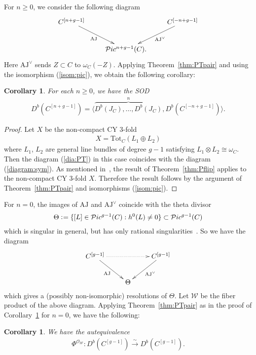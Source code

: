 \documentclass[11pt]{amsart}
\theoremstyle{plain}
\newtheorem{cor}[thm]{Corollary}
\newcommand{\oO}{\mathcal{O}}
\newcommand{\pP}{\mathcal{P}}
\newcommand{\wW}{\mathcal{W}}
\begin{document}
For $n\ge 0$, we consider the following 
diagram
\begin{align}\label{diagram:sym}
\xymatrix{
C^{[n+g-1]} \ar[rd]_-{\mathrm{AJ}} &  & 
C^{[-n+g-1]} \ar[ld]^-{\mathrm{AJ}^{\vee}} \\
&  \pP ic^{n+g-1}(C). &
}
\end{align}
Here $\mathrm{AJ}^{\vee}$ 
sends $Z \subset C$ to $\omega_C(-Z)$. 
Applying Theorem~\ref{thm:PTpair}
and using the isomorphism (\ref{isom:pic}), 
we obtain the following corollary:

\begin{cor}\label{thm:sod:sym}
For each $n\ge 0$, we have the SOD
\begin{align*}
D^b(C^{[n+g-1]})=
\langle \overbrace{D^b(J_C), \ldots, 
D^b(J_C)}^{n}, D^b(C^{[-n+g-1]}) \rangle. 
\end{align*}
\end{cor} 
\begin{proof}
Let 
$X$ be the non-compact CY 3-fold
\begin{align*}
X=\mathrm{Tot}_C(L_1 \oplus L_2)
\end{align*}
where $L_1$, $L_2$ are general line bundles 
of degree $g-1$ satisfying $L_1 \otimes L_2 \cong \omega_C$.
Then the diagram (\ref{dia:PT}) in this 
case coincides with the diagram (\ref{diagram:sym}).
As mentioned in~\cite[Example~9.22, Remark~9.23]{Toddbir}, 
the result of Theorem~\ref{thm:Pflip} applies 
to the non-compact CY 3-fold $X$. 
Therefore the result 
follows by the argument of Theorem~\ref{thm:PTpair}
and isomorphisms (\ref{isom:pic}). 
\end{proof}

For $n=0$, the images of
$\mathrm{AJ}$ and $\mathrm{AJ}^{\vee}$ coincide with
the theta divisor
\begin{align*}
\Theta \cneq \{ [L] \in \pP ic^{g-1}(C) : 
h^0(L) \neq 0\} \subset \pP ic^{g-1}(C)
\end{align*}
which is singular in general, but 
has only rational singularities~\cite{MR0349687}. 
So we have the diagram
\begin{align*}
\xymatrix{
C^{[g-1]} \ar[rd]_-{\mathrm{AJ}}  \ar@{.>}[rr]
& & C^{[g-1]} \ar[ld]^-{\mathrm{AJ}^{\vee}} \\
& \Theta &
}
\end{align*}
which gives a (possibly non-isomorphic) 
resolutions of $\Theta$. 
Let $\wW$ be the fiber 
product of the above diagram. 
Applying Theorem~\ref{thm:PTpair}
as in the proof of Corollary~\ref{thm:sod:sym} for $n=0$, 
we have the following:  
\begin{cor}\label{cor:symequiv}
We have the autequivalence
\begin{align}\label{cor:S}
\Phi^{\oO_{\wW}} \colon 
D^b(C^{[g-1]}) \stackrel{\sim}{\to}
D^b(C^{[g-1]}).
\end{align}
\end{cor}
\end{document}
